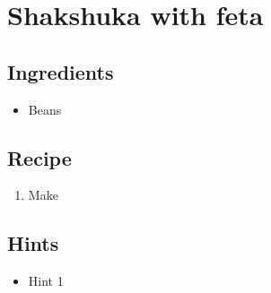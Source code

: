 \section{Shakshuka with feta}
\subsection*{Ingredients}
\begin{itemize}
    \item Beans
\end{itemize}

\subsection*{Recipe}
\begin{enumerate}
    \item Make
\end{enumerate}

\subsection*{Hints}
\begin{itemize}
    \item Hint 1
\end{itemize}
\newpage